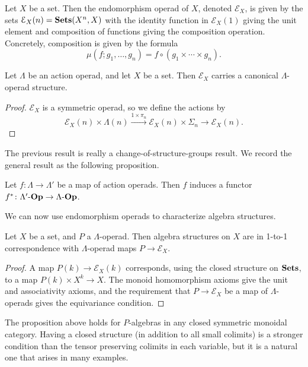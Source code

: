 Let $X$ be a set. Then the endomorphism operad of $X$, denoted $\mathcal{E}_{X}$, is given by the sets $\mathcal{E}_{X}(n) = \mathbf{Sets}(X^{n}, X)$ with the identity function in $\mathcal{E}_{X}(1)$ giving the unit element and composition of functions giving the composition operation. Concretely, composition is given by the formula
  \[
    \mu(f; g_{1}, \ldots, g_{n}) = f \circ (g_{1} \times \cdots \times g_{n}).
  \]

\begin{lem}
Let $\Lambda$ be an action operad, and let $X$ be a set. Then $\mathcal{E}_{X}$ carries a canonical $\Lambda$-operad structure.
\end{lem}
\begin{proof}
$\mathcal{E}_{X}$ is a symmetric operad, so we define the actions by
  \[
    \mathcal{E}_{X}(n) \times \Lambda(n) \stackrel{1 \times \pi_{n}}{\longrightarrow} \mathcal{E}_{X}(n) \times \Sigma_{n} \rightarrow \mathcal{E}_{X}(n).
  \]
\end{proof}

The previous result is really a change-of-structure-groups result. We record the general result as the following proposition.

\begin{prop}\label{prop:pbaop}
Let $f \colon \Lambda \rightarrow \Lambda'$ be a map of action operads. Then $f$ induces a functor $f^{*} \colon \Lambda'\mbox{-}\mathbf{Op} \rightarrow \Lambda\mbox{-}\mathbf{Op}$.
\end{prop}

We can now use endomorphism operads to characterize algebra structures.

\begin{prop}\label{endoalg}
Let $X$ be a set, and $P$ a $\Lambda$-operad. Then algebra structures on $X$ are in 1-to-1 correspondence with $\Lambda$-operad maps $P \rightarrow \mathcal{E}_{X}$.
\end{prop}
\begin{proof}
A map $P(k) \rightarrow \mathcal{E}_{X}(k)$ corresponds, using the closed structure on $\mathbf{Sets}$, to a map $P(k) \times X^{k} \rightarrow X$. The monoid homomorphism axioms give the unit and associativity axioms, and the requirement that $P \rightarrow \mathcal{E}_{X}$ be a map of $\Lambda$-operads gives the equivariance condition.
\end{proof}

\begin{rem}
The proposition above holds for $P$-algebras in any closed symmetric monoidal category. Having a closed structure (in addition to all small colimits) is a stronger condition than the tensor preserving colimits in each variable, but it is a natural one that arises in many examples.
\end{rem}





